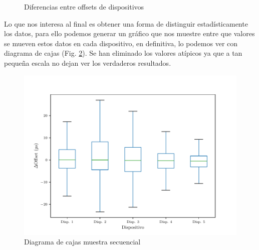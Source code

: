 \begin{figure}
    \centering
    \quad
    \caption{Diferencias entre offsets de dispositivos}
    \label{fig:off_acu_secuencial_diffs}
\end{figure}

Lo que nos interesa al final es obtener una forma de distinguir estadísticamente los datos, para ello podemos generar un gráfico que nos muestre entre que valores se mueven estos datos en cada dispositivo, en definitiva, lo podemos ver con diagrama de cajas (Fig. \ref{fig:box_secuencial}). Se han eliminado los valores atípicos ya que a tan pequeña escala no dejan ver los verdaderos resultados.

\begin{figure}
    \centering
    \includegraphics[scale=0.7]{../Python/plots/individual/boxplot_no_out}
    \caption{Diagrama de cajas muestra secuencial}
    \label{fig:box_secuencial}
\end{figure}

